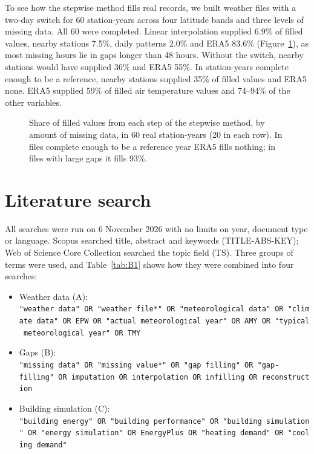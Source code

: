 To see how the stepwise method fills real records, we built weather files with a two-day switch for 60 station-years across four latitude bands and three levels of missing data. All 60 were completed. Linear interpolation supplied 6.9\% of filled values, nearby stations 7.5\%, daily patterns 2.0\% and ERA5 83.6\% (Figure~\ref{fig:A1}), as most missing hours lie in gaps longer than 48 hours. Without the switch, nearby stations would have supplied 36\% and ERA5 55\%. In station-years complete enough to be a reference, nearby stations supplied 35\% of filled values and ERA5 none. ERA5 supplied 59\% of filled air temperature values and 74--94\% of the other variables.

\begin{figure}[tbp]
\centering
{}
\caption{Share of filled values from each step of the stepwise method, by amount of missing data, in 60 real station-years (20 in each row). In files complete enough to be a reference year ERA5 fills nothing; in files with large gaps it fills 93\%.}
\label{fig:A1}
\end{figure}

\section{Literature search}\label{app:B}
\setcounter{figure}{0}\setcounter{table}{0}
\renewcommand{\thefigure}{B\arabic{figure}}
\renewcommand{\thetable}{B\arabic{table}}

All searches were run on 6 November 2026 with no limits on year, document type or language. Scopus searched title, abstract and keywords (TITLE-ABS-KEY); Web of Science Core Collection searched the topic field (TS). Three groups of terms were used, and Table~\ref{tab:B1} shows how they were combined into four searches:

\begin{itemize}
\item
  Weather data (A): \texttt{"weather\ data"\ OR\ "weather\ file*"\ OR\ "meteorological\ data"\ OR\ "climate\ data"\ OR\ EPW\ OR\ "actual\ meteorological\ year"\ OR\ AMY\ OR\ "typical\ meteorological\ year"\ OR\ TMY}
\item
  Gaps (B): \texttt{"missing\ data"\ OR\ "missing\ value*"\ OR\ "gap\ filling"\ OR\ "gap-filling"\ OR\ imputation\ OR\ interpolation\ OR\ infilling\ OR\ reconstruction}
\item
  Building simulation (C): \texttt{"building\ energy"\ OR\ "building\ performance"\ OR\ "building\ simulation"\ OR\ "energy\ simulation"\ OR\ EnergyPlus\ OR\ "heating\ demand"\ OR\ "cooling\ demand"}
\end{itemize}

